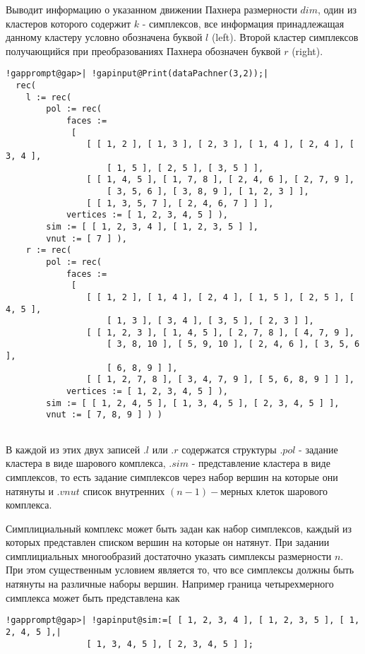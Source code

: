 \documentclass[a4paper,11pt]{report}
\begin{document}
{{{ Выводит
информацию
о
указанном
движении
Пахнера
размерности $dim$, один
из
кластеров
которого
содержит $k$ -
симплексов,
все
информация
принадлежащая
данному
кластеру
условно
обозначена
буквой $l$ (left).
Второй
кластер
симплексов
получающийся
при
преобразованиях
Пахнера
обозначен
буквой $r$ (right). 
\begin{Verbatim}[commandchars=!@|,fontsize=\small,frame=single,label=Пример]
  !gapprompt@gap>| !gapinput@Print(dataPachner(3,2));|
  rec(
    l := rec(
        pol := rec(
            faces :=
             [
                [ [ 1, 2 ], [ 1, 3 ], [ 2, 3 ], [ 1, 4 ], [ 2, 4 ], [ 3, 4 ],
                    [ 1, 5 ], [ 2, 5 ], [ 3, 5 ] ],
                [ [ 1, 4, 5 ], [ 1, 7, 8 ], [ 2, 4, 6 ], [ 2, 7, 9 ],
                    [ 3, 5, 6 ], [ 3, 8, 9 ], [ 1, 2, 3 ] ],
                [ [ 1, 3, 5, 7 ], [ 2, 4, 6, 7 ] ] ],
            vertices := [ 1, 2, 3, 4, 5 ] ),
        sim := [ [ 1, 2, 3, 4 ], [ 1, 2, 3, 5 ] ],
        vnut := [ 7 ] ),
    r := rec(
        pol := rec(
            faces :=
             [
                [ [ 1, 2 ], [ 1, 4 ], [ 2, 4 ], [ 1, 5 ], [ 2, 5 ], [ 4, 5 ],
                    [ 1, 3 ], [ 3, 4 ], [ 3, 5 ], [ 2, 3 ] ],
                [ [ 1, 2, 3 ], [ 1, 4, 5 ], [ 2, 7, 8 ], [ 4, 7, 9 ],
                    [ 3, 8, 10 ], [ 5, 9, 10 ], [ 2, 4, 6 ], [ 3, 5, 6 ],
                    [ 6, 8, 9 ] ],
                [ [ 1, 2, 7, 8 ], [ 3, 4, 7, 9 ], [ 5, 6, 8, 9 ] ] ],
            vertices := [ 1, 2, 3, 4, 5 ] ),
        sim := [ [ 1, 2, 4, 5 ], [ 1, 3, 4, 5 ], [ 2, 3, 4, 5 ] ],
        vnut := [ 7, 8, 9 ] ) )
    						
\end{Verbatim}
 В
каждой
из
этих
двух
записей $.l$ или $.r$ содержатся
структуры $.pol$ -
задание
кластера
в виде
шарового
комплекса, $.sim$ -
представление
кластера
в виде
симплексов,
то
есть
задание
симплексов
через
набор
вершин
на
которые
они
натянуты
и $.vnut$ список
внутренних $(n-1)-$мерных
клеток
шарового
комплекса. }

 Симплициальный
комплекс
может
быть
задан
как
набор
симплексов,
каждый
из
которых
представлен
списком
вершин
на
которые
он
натянут.
При
задании
симплициальных
многообразий
достаточно
указать
симплексы
размерности $n.$ При
этом
существенным
условием
является
то, что
все
симплексы
должны
быть
натянуты
на
различные
наборы
вершин.
Например
граница
четырехмерного
симплекса
может
быть
представлена
как 
\begin{Verbatim}[commandchars=!@|,fontsize=\small,frame=single,label=Пример]
  !gapprompt@gap>| !gapinput@sim:=[ [ 1, 2, 3, 4 ], [ 1, 2, 3, 5 ], [ 1, 2, 4, 5 ],|
  				[ 1, 3, 4, 5 ], [ 2, 3, 4, 5 ] ];
  				

\end{Verbatim}}}
\end{document}
